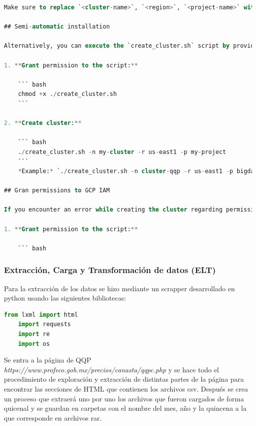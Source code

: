 \documentclass{article}
\begin{document}
\begin{lstlisting}[language=sql,caption={bash version}]
Make sure to replace `<cluster-name>`, `<region>`, `<project-name>` with your actual information.

## Semi-automatic installation

Alternatively, you can execute the `create_cluster.sh` script by providing three parameters: `cluster name`, `region`, and `project name`.

1. **Grant permission to the script:**

    ``` bash
    chmod +x ./create_cluster.sh
    ```

2. **Create cluster:**

    ``` bash
    ./create_cluster.sh -n my-cluster -r us-east1 -p my-project
    ```
    *Example:* `./create_cluster.sh -n cluster-qqp -r us-east1 -p bigdata-qqp2`

## Gran permissions to GCP IAM

If you encounter an error while creating the cluster regarding permissions, follow these steps.

1. **Grant permission to the script:**

    ``` bash
\end{lstlisting}

\subsubsection{Extracción, Carga y Transformación de datos (ELT)}

Para la extracción de los datos se hizo mediante un scrapper desarrollado en python usando las siguientes bibliotecas:\\
\begin{lstlisting}[language=Python]
    from lxml import html
    import requests
    import re
    import os
\end{lstlisting}

Se entra a la página de QQP \textit{https://www.profeco.gob.mx/precios/canasta/qqpc.php} y se hace todo el procedimiento de exploración y extracción de distintas partes de la página para encontrar las secciones de HTML que contienen los archivos csv. Después se crea un proceso que extraerá uno por uno los archivos que fueron cargados de forma quicenal y se guardan en carpetas con el nombre del mes, año y la quincena a la que corresponde en archivos rar. 
\end{document}
